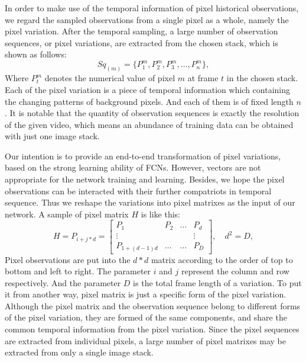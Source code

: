 \documentclass[journal]{IEEEtran}
\begin{document}
In order to make use of the temporal information of pixel historical observations, we regard the sampled observations from a single pixel as a whole, namely the pixel variation. 
After the temporal sampling, a large number of observation sequences, or pixel variations, are extracted from the chosen stack, which is shown as follows:
\begin{equation}
Sq_{(m)}=\{P_1^m,P_2^m,P_3^m,\dots,P_n^m\},
\end{equation}
Where $P_t^m$ denotes the numerical value of pixel $m$ at frame $t$ in the chosen stack. 
Each of the pixel variation is a piece of temporal information which containing the changing patterns of background pixels. 
And each of them is of fixed length $n$. 
It is notable that the quantity of observation sequences is exactly the resolution of the given video, which means an abundance of training data can be obtained with just one image stack. 


Our intention is to provide an end-to-end transformation of pixel variations, based on the strong learning ability of FCNs. 
However, vectors are not appropriate for the network training and learning. 
Besides, we hope the pixel observations can be interacted with their further compatriots in temporal sequence. 
Thus we reshape the variations into pixel matrixes as the input of our network. 
A sample of pixel matrix $H$ is like this:
\begin{equation}
H=P_{i+j*d}=\begin{bmatrix}
 P_1& P_2  &\dots  &P_d \\ 
\vdots &  &  &\vdots \\ 
 P_{1+(d-1)d}& \dots & \dots & P_D
\end{bmatrix},\quad d^2=D,
\end{equation}
Pixel observations are put into the $d*d$ matrix according to the order of top to bottom and left to right. 
The parameter $i$ and $j$ represent the column and row respectively. 
And the parameter $D$ is the total frame length of a variation. 
To put it from another way, pixel matrix is just a specific form of the pixel variation. 
Although the pixel matrix and the observation sequence belong to different forms of the pixel variation, they are formed of the same components, and share the common temporal information from the pixel variation. 
Since the pixel sequences are extracted from individual pixels, a large number of pixel matrixes may be extracted from only a single image stack.
\end{document}
